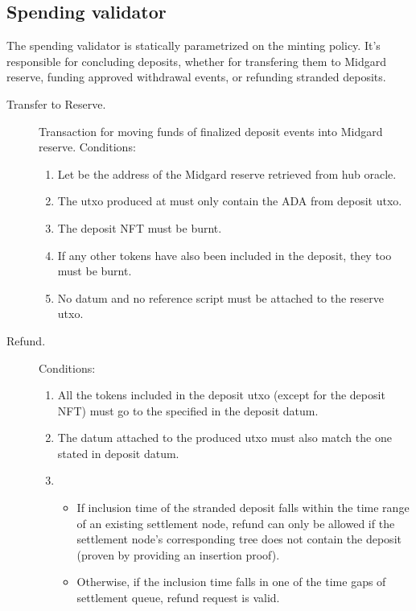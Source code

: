 \documentclass[../midgard.tex]{subfiles}
\begin{document}
\subsection{Spending validator}
\label{h:deposit-spending-validator}

The  spending validator is statically parametrized on the  minting policy.
It's responsible for concluding deposits, whether for transfering them to Midgard reserve, funding approved withdrawal events, or refunding stranded deposits.

\begin{description}
  \item[Transfer to Reserve.] Transaction for moving funds of finalized deposit events into Midgard reserve.
    Conditions:
    \begin{enumerate}
      \item Let  be the address of the Midgard reserve retrieved from hub oracle.
      \item The utxo produced at  must only contain the ADA from deposit utxo.
      \item The deposit NFT must be burnt.
      \item If any other tokens have also been included in the deposit, they too must be burnt.
      \item No datum and no reference script must be attached to the reserve utxo.
    \end{enumerate}
  \item[Refund.] 
    Conditions:
    \begin{enumerate}
      \item All the tokens included in the deposit utxo (except for the deposit NFT) must go to the  specified in the deposit datum.
      \item The datum attached to the produced utxo must also match the one stated in deposit datum.
      \item 
        \begin{itemize}
          \item If inclusion time of the stranded deposit falls within the time range of an existing settlement node, refund can only be allowed if the settlement node's corresponding tree does not contain the deposit (proven by providing an insertion proof).
          \item Otherwise, if the inclusion time falls in one of the time gaps of settlement queue, refund request is valid.
        \end{itemize}
    \end{enumerate}
\end{description}
\end{document}
